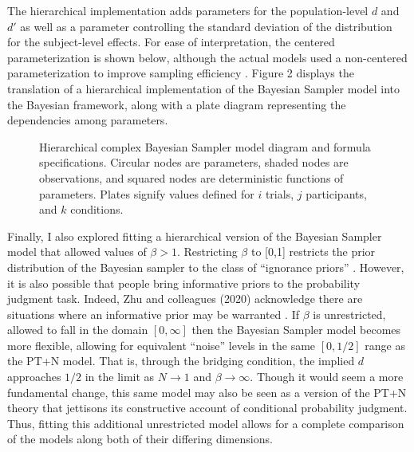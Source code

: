 \documentclass[
  english,
  man,floatsintext]{apa6}
\begin{document}
The hierarchical implementation adds parameters for the population-level \(d\) and \(d'\) as well as a parameter controlling the standard deviation of the distribution for the subject-level effects. For ease of interpretation, the centered parameterization is shown below, although the actual models used a non-centered parameterization to improve sampling efficiency \autocite{papaspiliopoulos.etal2007}. Figure 2 displays the translation of a hierarchical implementation of the Bayesian Sampler model into the Bayesian framework, along with a plate diagram representing the dependencies among parameters.

\begin{figure}
  \begin{minipage}{.5\textwidth}
    \flushright
    
  \end{minipage}%
  \begin{minipage}{.5\textwidth}
    \flushleft
    \small
    
  \end{minipage}
  \caption{Hierarchical complex Bayesian Sampler model diagram and formula specifications. Circular nodes are parameters, shaded nodes are observations, and squared nodes are deterministic functions of parameters. Plates signify values defined for $i$ trials, $j$ participants, and $k$ conditions.}
\end{figure}

Finally, I also explored fitting a hierarchical version of the Bayesian Sampler model that allowed values of \(\beta > 1\). Restricting \(\beta\) to {[}0,1{]} restricts the prior distribution of the Bayesian sampler to the class of ``ignorance priors'' \autocite{zhu.etal2020}. However, it is also possible that people bring informative priors to the probability judgment task. Indeed, Zhu and colleagues (2020) acknowledge there are situations where an informative prior may be warranted \autocite[see e.g.,][]{fennell.baddeley2012}. If \(\beta\) is unrestricted, allowed to fall in the domain \([0, \infty]\) then the Bayesian Sampler model becomes more flexible, allowing for equivalent ``noise'' levels in the same \([0, 1/2]\) range as the PT+N model. That is, through the bridging condition, the implied \(d\) approaches \(1/2\) in the limit as \(N \to 1\) and \(\beta \to \infty\). Though it would seem a more fundamental change, this same model may also be seen as a version of the PT+N theory that jettisons its constructive account of conditional probability judgment. Thus, fitting this additional unrestricted model allows for a complete comparison of the models along both of their differing dimensions.
\end{document}
